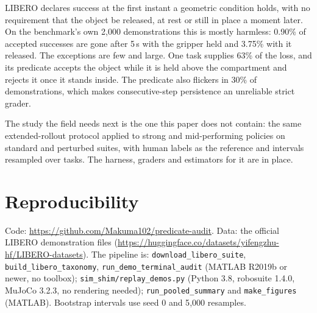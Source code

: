 \documentclass[10pt,twocolumn]{article}
\begin{document}
LIBERO declares success at the first instant a geometric condition holds, with no requirement that the object be released, at rest or still in place a moment later. On the benchmark's own 2{,}000 demonstrations this is mostly harmless: 0.90\% of accepted successes are gone after 5\,s with the gripper held and 3.75\% with it released. The exceptions are few and large. One task supplies 63\% of the loss, and its predicate accepts the object while it is held above the compartment and rejects it once it stands inside. The predicate also flickers in 30\% of demonstrations, which makes consecutive-step persistence an unreliable strict grader.

The study the field needs next is the one this paper does not contain: the same extended-rollout protocol applied to strong and mid-performing policies on standard and perturbed suites, with human labels as the reference and intervals resampled over tasks. The harness, graders and estimators for it are in place.

\section*{Reproducibility}
Code: \url{https://github.com/Makuma102/predicate-audit}. Data: the official LIBERO demonstration files (\url{https://huggingface.co/datasets/yifengzhu-hf/LIBERO-datasets}). The pipeline is: \texttt{download\_libero\_suite}, \texttt{build\_libero\_taxonomy}, \texttt{run\_demo\_terminal\_audit} (MATLAB R2019b or newer, no toolbox); \texttt{sim\_shim/replay\_demos.py} (Python 3.8, robosuite 1.4.0, MuJoCo 3.2.3, no rendering needed); \texttt{run\_pooled\_summary} and \texttt{make\_figures} (MATLAB). Bootstrap intervals use seed 0 and 5{,}000 resamples.
\end{document}
